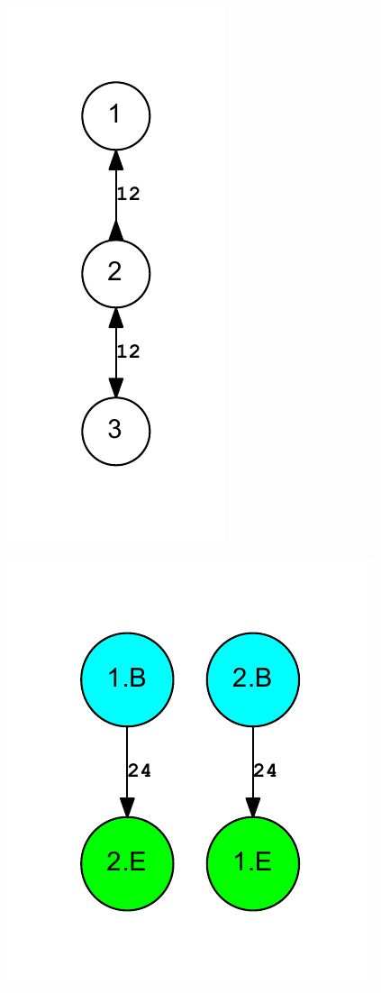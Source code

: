 \documentclass[letterpaper,12pt]{article}
\begin{document}
\begin{figure}
\includegraphics{out.reduced.bidigraph.pdf}
\end{figure}

\begin{figure}
\includegraphics{out.reduced.collapsed.digraph.pdf}
\end{figure}
\end{document}
